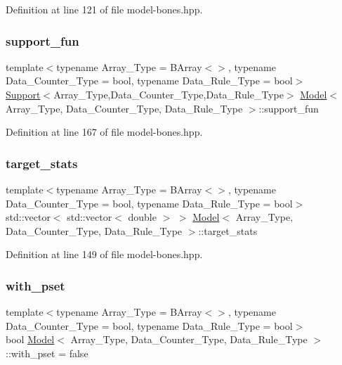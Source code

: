 Definition at line 121 of file model-\/bones.\+hpp.

\mbox{\label{class_model_aa9806f4bf7d9c935f37a31e67bbfbee4}} 
\subsubsection{\texorpdfstring{support\+\_\+fun}{support\_fun}}
{\footnotesize\ttfamily template$<$typename Array\+\_\+\+Type = B\+Array$<$$>$, typename Data\+\_\+\+Counter\+\_\+\+Type = bool, typename Data\+\_\+\+Rule\+\_\+\+Type = bool$>$ \\
\hyperlink{class_support}{Support}$<$Array\+\_\+\+Type,Data\+\_\+\+Counter\+\_\+\+Type,Data\+\_\+\+Rule\+\_\+\+Type$>$ \hyperlink{class_model}{Model}$<$ Array\+\_\+\+Type, Data\+\_\+\+Counter\+\_\+\+Type, Data\+\_\+\+Rule\+\_\+\+Type $>$\+::support\+\_\+fun}



Definition at line 167 of file model-\/bones.\+hpp.

\mbox{\label{class_model_a24ad6e57bff2297dcc7461609714f41b}} 
\subsubsection{\texorpdfstring{target\+\_\+stats}{target\_stats}}
{\footnotesize\ttfamily template$<$typename Array\+\_\+\+Type = B\+Array$<$$>$, typename Data\+\_\+\+Counter\+\_\+\+Type = bool, typename Data\+\_\+\+Rule\+\_\+\+Type = bool$>$ \\
std\+::vector$<$ std\+::vector$<$ double $>$ $>$ \hyperlink{class_model}{Model}$<$ Array\+\_\+\+Type, Data\+\_\+\+Counter\+\_\+\+Type, Data\+\_\+\+Rule\+\_\+\+Type $>$\+::target\+\_\+stats}



Definition at line 149 of file model-\/bones.\+hpp.

\mbox{\label{class_model_afd37924e6fcfdc30c9fc5ad56f1c4947}} 
\subsubsection{\texorpdfstring{with\+\_\+pset}{with\_pset}}
{\footnotesize\ttfamily template$<$typename Array\+\_\+\+Type = B\+Array$<$$>$, typename Data\+\_\+\+Counter\+\_\+\+Type = bool, typename Data\+\_\+\+Rule\+\_\+\+Type = bool$>$ \\
bool \hyperlink{class_model}{Model}$<$ Array\+\_\+\+Type, Data\+\_\+\+Counter\+\_\+\+Type, Data\+\_\+\+Rule\+\_\+\+Type $>$\+::with\+\_\+pset = false}



